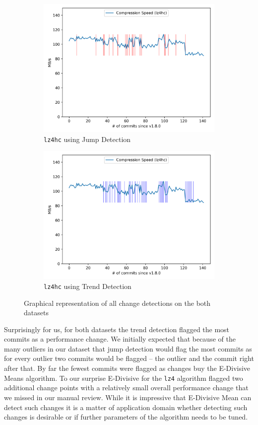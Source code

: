 \documentclass[	runningheads,
				a4paper]{llncs}
\begin{document}
\begin{figure}[ht!]
\begin{subfigure}[b]{0.3\textwidth}
		\includegraphics[width=\textwidth]{graph/lz4hc_commit_jump}
		\caption{\texttt{lz4hc} using Jump Detection}
	\end{subfigure}
	\begin{subfigure}[b]{0.3\textwidth}
		\includegraphics[width=\textwidth]{graph/lz4hc_commit_trend}
		\caption{\texttt{lz4hc} using Trend Detection}
	\end{subfigure}
	\caption{Graphical representation of all change detections on the both datasets}
	\label{fig:perf_commit_cp}
\end{figure}

Surprisingly for us, for both datasets the trend detection flagged the most commits as a performance change. We initially expected that because of the many outliers in our dataset that jump detection would flag the most commits as for every outlier two commits would be flagged -- the outlier and the commit right after that. By far the fewest commits were flagged as changes buy the E-Divisive Means algorithm. To our surprise E-Divisive for the \texttt{lz4} algorithm flagged two additional change points with a relatively small overall performance change that we missed in our manual review. While it is impressive that E-Divisive Mean can detect such changes it is a matter of application domain whether detecting such changes is desirable or if further parameters of the algorithm needs to be tuned.
\end{document}
